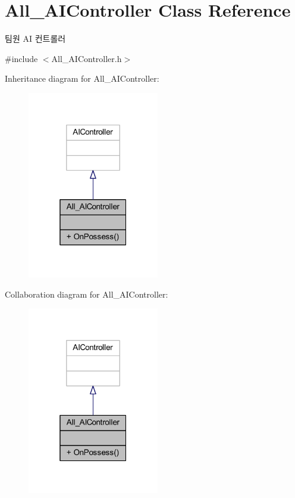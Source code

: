 \hypertarget{class_all___a_i_controller}{}\section{All\+\_\+\+A\+I\+Controller Class Reference}
\label{class_all___a_i_controller}


팀원 AI 컨트롤러  




{\ttfamily \#include $<$All\+\_\+\+A\+I\+Controller.\+h$>$}



Inheritance diagram for All\+\_\+\+A\+I\+Controller\+:\nopagebreak
\begin{figure}[H]
\begin{center}
\leavevmode
\includegraphics[width=163pt]{class_all___a_i_controller__inherit__graph}
\end{center}
\end{figure}


Collaboration diagram for All\+\_\+\+A\+I\+Controller\+:\nopagebreak
\begin{figure}[H]
\begin{center}
\leavevmode
\includegraphics[width=163pt]{class_all___a_i_controller__coll__graph}
\end{center}
\end{figure}
